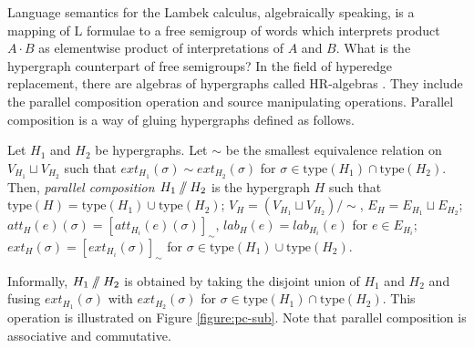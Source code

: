 \documentclass[a4paper,UKenglish,cleveref, autoref, thm-restate,pdfa]{lipics-v2021}
\newcommand{\lab}{\mathit{lab}}
\newcommand{\att}{\mathit{att}}
\newcommand{\ext}{\mathit{ext}}
\newcommand{\type}{\mathrm{type}}
\newcommand{\pc}{\mathbin{/\mkern-6mu/}}
\begin{document}
Language semantics for the Lambek calculus, algebraically speaking, is a mapping of $\mathrm{L}$ formulae to a free semigroup of words which interprets product $A \cdot B$ as elementwise product of interpretations of $A$ and $B$. What is the hypergraph counterpart of free semigroups? In the field of hyperedge replacement, there are algebras of hypergraphs called HR-algebras \cite{Courcelle90,CourcelleE12,Rozenberg97}. They include the parallel composition operation and source manipulating operations. Parallel composition is a way of gluing hypergraphs defined as follows.
\begin{definition}\label{definition:pc}
	Let $H_1$ and $H_2$ be hypergraphs. Let $\sim$ be the smallest equivalence relation on $V_{H_1} \sqcup V_{H_2}$ such that $\ext_{H_1}(\sigma) \sim \ext_{H_2}(\sigma)$ for $\sigma \in \type(H_1) \cap \type(H_2)$. Then, \emph{parallel composition $H_1 \pc H_2$} is the hypergraph $H$ such that $\type(H) = \type(H_1) \cup \type(H_2)$; $V_H = (V_{H_1} \sqcup V_{H_2})/\sim$, $E_H = E_{H_1} \sqcup E_{H_2}$; $\att_H(e)(\sigma) = [\att_{H_i}(e)(\sigma)]_\sim$, $\lab_H(e)=\lab_{H_i}(e)$ for $e \in E_{H_i}$; $\ext_H(\sigma)=[\ext_{H_i}(\sigma)]_\sim$ for $\sigma \in \type(H_1) \cup \type(H_2)$.
\end{definition}
Informally, $H_1 \pc H_2$ is obtained by taking the disjoint union of $H_1$ and $H_2$ and fusing $\ext_{H_1}(\sigma)$ with $\ext_{H_2}(\sigma)$ for $\sigma \in \type(H_1) \cap \type(H_2)$. This operation is illustrated on Figure \ref{figure:pc-sub}. Note that parallel composition is associative and commutative.
\end{document}
